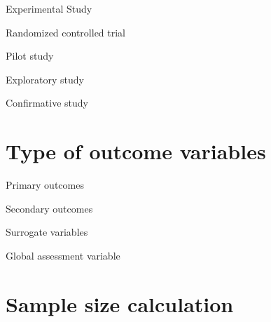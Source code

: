 \documentclass[9pt,ignorenonframetext,xcolor=dvipsnames]{beamer}
\begin{document}
\begin{frame}{Experimental Study}

\begin{block}{Randomized controlled trial}

\end{block}

\begin{block}{Pilot study}

\end{block}

\begin{block}{Exploratory study}

\end{block}

\begin{block}{Confirmative study}

\end{block}

\end{frame}

\section{Type of outcome variables}\label{type-of-outcome-variables}

\begin{frame}{Primary outcomes}

\end{frame}

\begin{frame}{Secondary outcomes}

\end{frame}

\begin{frame}{Surrogate variables}

\end{frame}

\begin{frame}{Global assessment variable}

\end{frame}

\section{Sample size calculation}\label{sample-size-calculation}
\end{document}
